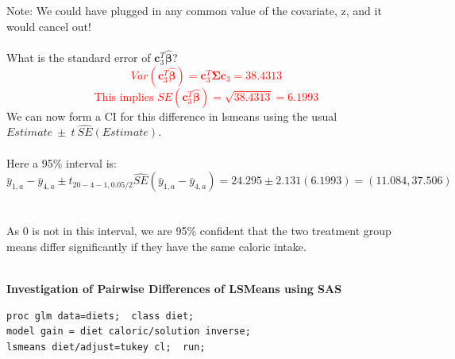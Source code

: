 Note: We could have plugged in any common value of the covariate, z, and it would cancel out!\\~\\

What is the standard error of $\textbf{c}^{T}_3\hat{\boldsymbol{\beta}}$?\\
\textcolor{red}{$$Var(\textbf{c}^{T}_3\hat{\boldsymbol{\beta}}) =\textbf{c}^{T}_3\hat{\boldsymbol{\Sigma}}\textbf{c}_3 = 38.4313$$
$$\mbox{This implies } SE(\textbf{c}_3^{T}\hat{\boldsymbol{\beta}})=\sqrt{38.4313}=6.1993$$}
We can now form a CI for this difference in lsmeans using the usual $Estimate~\pm~t~\hat{SE}(Estimate)$.\\~\\
Here a 95\% interval is: 
$$\bar{y}_{1,a}-\bar{y}_{4,a}\pm t_{20-4-1,0.05/2}\hat{SE}(\bar{y}_{1,a}-\bar{y}_{4,a}) =  24.295\pm 2.131(6.1993) = (11.084,37.506)$$\\~\\
As 0 is not in this interval, we are 95\% confident that the two treatment group means differ significantly if they have the same caloric intake.\\~\\

\newpage

\Large\textbf{Investigation of Pairwise Differences of LSMeans using SAS}\large
\begin{small}
\begin{verbatim}
proc glm data=diets;  class diet;
model gain = diet caloric/solution inverse;
lsmeans diet/adjust=tukey cl;  run;
\end{verbatim}
\end{small}

